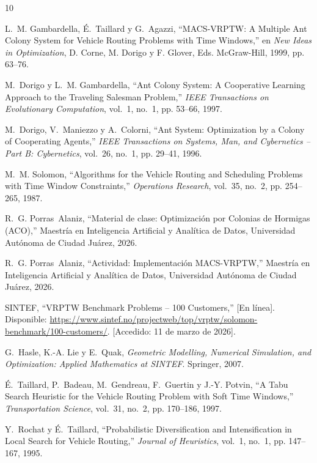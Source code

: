 \documentclass[12pt, letterpaper]{article}
\begin{document}
\begin{thebibliography}{10}

L.~M. Gambardella, É.~Taillard y G.~Agazzi,
``MACS-VRPTW: A Multiple Ant Colony System for Vehicle Routing Problems with Time Windows,''
en \textit{New Ideas in Optimization}, D. Corne, M. Dorigo y F. Glover, Eds.
McGraw-Hill, 1999, pp. 63--76.

M.~Dorigo y L.~M. Gambardella,
``Ant Colony System: A Cooperative Learning Approach to the Traveling Salesman Problem,''
\textit{IEEE Transactions on Evolutionary Computation}, vol.~1, no.~1, pp. 53--66, 1997.

M.~Dorigo, V.~Maniezzo y A.~Colorni,
``Ant System: Optimization by a Colony of Cooperating Agents,''
\textit{IEEE Transactions on Systems, Man, and Cybernetics -- Part B: Cybernetics}, vol.~26, no.~1, pp. 29--41, 1996.

M.~M. Solomon,
``Algorithms for the Vehicle Routing and Scheduling Problems with Time Window Constraints,''
\textit{Operations Research}, vol.~35, no.~2, pp. 254--265, 1987.

R.~G. Porras~Alaniz,
``Material de clase: Optimización por Colonias de Hormigas (ACO),''
Maestría en Inteligencia Artificial y Analítica de Datos, Universidad Autónoma de Ciudad Juárez, 2026.

R.~G. Porras~Alaniz,
``Actividad: Implementación MACS-VRPTW,''
Maestría en Inteligencia Artificial y Analítica de Datos, Universidad Autónoma de Ciudad Juárez, 2026.

SINTEF, ``VRPTW Benchmark Problems -- 100 Customers,'' [En línea]. Disponible: \url{https://www.sintef.no/projectweb/top/vrptw/solomon-benchmark/100-customers/}. [Accedido: 11 de marzo de 2026].

G.~Hasle, K.-A. Lie y E.~Quak,
\textit{Geometric Modelling, Numerical Simulation, and Optimization: Applied Mathematics at SINTEF}.
Springer, 2007.

É.~Taillard, P.~Badeau, M.~Gendreau, F.~Guertin y J.-Y. Potvin,
``A Tabu Search Heuristic for the Vehicle Routing Problem with Soft Time Windows,''
\textit{Transportation Science}, vol.~31, no.~2, pp. 170--186, 1997.

Y.~Rochat y É.~Taillard,
``Probabilistic Diversification and Intensification in Local Search for Vehicle Routing,''
\textit{Journal of Heuristics}, vol.~1, no.~1, pp. 147--167, 1995.

\end{thebibliography}
\end{document}
